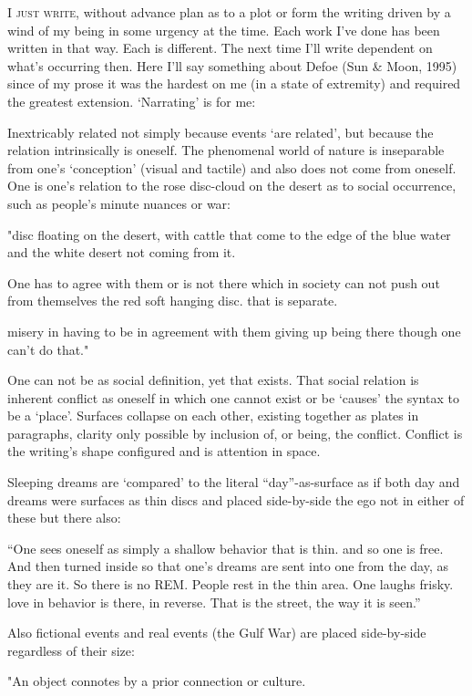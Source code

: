 \documentclass[
]{memoir}
\begin{document}
\lettrine[lines=3, findent=0em, nindent=0.1em, lhang=0]{I}{ just write,}
without advance plan as to a plot or form the writing driven by a wind
of my being in some urgency at the time. Each work I've done has been
written in that way. Each is different. The next time I'll write
dependent on what's occurring then. Here I'll say something about Defoe
(Sun \& Moon, 1995) since of my prose it was the hardest on me (in a
state of extremity) and required the greatest extension. `Narrating' is
for me:

Inextricably related not simply because events `are related', but
because the relation intrinsically is oneself. The phenomenal world of
nature is inseparable from one's `conception' (visual and tactile) and
also does not come from oneself. One is one's relation to the rose
disc-cloud on the desert as to social occurrence, such as people's
minute nuances or war:

"disc floating on the desert, with cattle that come to the edge of the
blue water and the white desert not coming from it.

One has to agree with them or is not there which in society can not push
out from themselves the red soft hanging disc. that is separate.

misery in having to be in agreement with them giving up being there
though one can't do that."

One can not be as social definition, yet that exists. That social
relation is inherent conflict as oneself in which one cannot exist or be
`causes' the syntax to be a `place'. Surfaces collapse on each other,
existing together as plates in paragraphs, clarity only possible by
inclusion of, or being, the conflict. Conflict is the writing's shape
configured and is attention in space.

Sleeping dreams are `compared' to the literal ``day''-as-surface as if
both day and dreams were surfaces as thin discs and placed side-by-side
the ego not in either of these but there also:

``One sees oneself as simply a shallow behavior that is thin. and so one
is free. And then turned inside so that one's dreams are sent into one
from the day, as they are it. So there is no REM. People rest in the
thin area. One laughs frisky. love in behavior is there, in reverse.
That is the street, the way it is seen.''

Also fictional events and real events (the Gulf War) are placed
side-by-side regardless of their size:

"An object connotes by a prior connection or culture.
\end{document}
